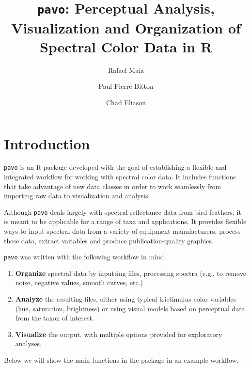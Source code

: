 \documentclass{article}
\newcommand{\pavo}{{\tt pavo}}  %
\begin{document}



\title{\pavo{}: {\bf P}erceptual {\bf A}nalysis, {\bf V}isualization and {\bf O}rganization of Spectral Color Data in R}
\author[1]{Rafael Maia}
\author[2]{Paul-Pierre Bitton}
\author[1]{Chad Eliason}
\maketitle

\addtolength{\parskip}{-.08in}
\tableofcontents
\addtolength{\parskip}{.08in}

\section*{Introduction}

\pavo{} is an R package developed with the goal of establishing a flexible and integrated 
workflow for working with spectral color data. It includes functions that take advantage of
new data classes in order to work seamlessly from importing raw data to visualization and 
analysis.

Although \pavo{} deals largely with spectral reflectance data from bird feathers, it is meant 
to be applicable for a range of taxa and applications. It provides flexible ways to input
spectral data from a variety of equipment manufacturers, process these data, extract variables 
and produce publication-quality graphics.

\pavo{} was written with the following workflow in mind:

\begin{enumerate}
\item {\bf Organize} spectral data by inputting files, processing spectra (e.g., to remove
noise, negative values, smooth curves, etc.)
\item {\bf Analyze} the resulting files, either using typical tristimulus color variables (hue,
saturation, brightness) or using visual models based on perceptual data from the taxon of 
interest.
\item {\bf Visualize} the output, with multiple options provided for exploratory analyses.
\end{enumerate}

Below we will show the main functions in the package in an example workflow. 
\end{document}
